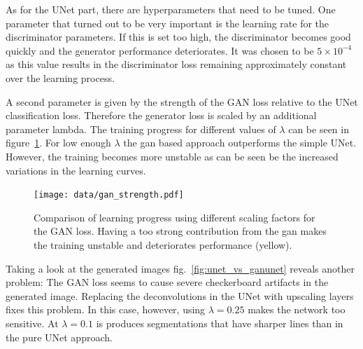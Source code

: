 \documentclass[aps,prl,twocolumn,groupedaddress,amsmath,amssymb]{revtex4-1}
\begin{document}
    As for the UNet part, there are hyperparameters that need to be tuned. One parameter that turned
    out to be very important is the learning rate for the discriminator parameters. If this is set 
    too high, the discriminator becomes good quickly and the generator performance deteriorates.
    It was chosen to be $5\times10^{-4}$ as this value results in the discriminator loss remaining 
    approximately constant over the learning process.

    A second parameter is given by the strength of the GAN loss relative to the UNet classification
    loss. Therefore the generator loss is scaled by an additional parameter lambda. The training 
    progress for different values of $\lambda$ can be seen in figure~\ref{fig:gan_strength}. For low
    enough $\lambda$ the gan based approach outperforms the simple UNet. However, the training 
    becomes more unstable as can be seen be the increased variations in the learning curves.

    \begin{figure}[tbp]
        \begin{center}
        \texttt{[image: data/gan\_strength.pdf]}
        \end{center}
        \caption{Comparison of learning progress using different scaling factors for the GAN loss.
        Having a too strong contribution from the gan makes the training unstable and 
        deteriorates performance (yellow).}
        \label{fig:gan_strength}
    \end{figure}

    Taking a look at the generated images fig.~\ref{fig:unet_vs_ganunet} reveals another problem: 
    The GAN loss seems to cause severe checkerboard artifacts in the generated image. Replacing the
    deconvolutions in the UNet with upscaling layers fixes this problem. In this case, however, 
    using $\lambda=0.25$ makes the network too sensitive. At $\lambda=0.1$ is produces segmentations
    that have sharper lines than in the pure UNet approach.
\end{document}
